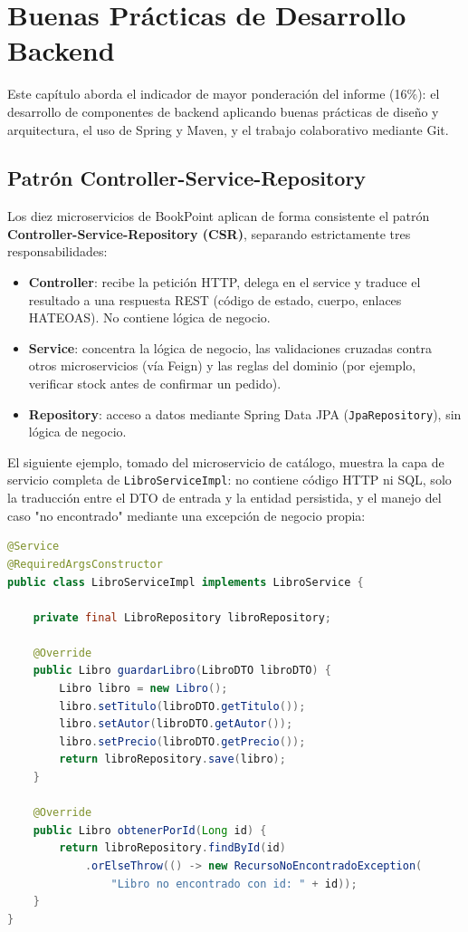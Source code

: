 \chapter{Buenas Prácticas de Desarrollo Backend}
\label{ch:buenas-practicas}

Este capítulo aborda el indicador de mayor ponderación del informe (16\%): el desarrollo
de componentes de backend aplicando buenas prácticas de diseño y arquitectura, el uso de
Spring y Maven, y el trabajo colaborativo mediante Git.

\section{Patrón Controller-Service-Repository}

Los diez microservicios de BookPoint aplican de forma consistente el patrón
\textbf{Controller-Service-Repository (CSR)}, separando estrictamente tres
responsabilidades:

\begin{itemize}
    \item \textbf{Controller}: recibe la petición HTTP, delega en el service y traduce
    el resultado a una respuesta REST (código de estado, cuerpo, enlaces HATEOAS). No
    contiene lógica de negocio.
    \item \textbf{Service}: concentra la lógica de negocio, las validaciones cruzadas
    contra otros microservicios (vía Feign) y las reglas del dominio (por ejemplo,
    verificar stock antes de confirmar un pedido).
    \item \textbf{Repository}: acceso a datos mediante Spring Data JPA
    (\texttt{JpaRepository}), sin lógica de negocio.
\end{itemize}

El siguiente ejemplo, tomado del microservicio de catálogo, muestra la capa de servicio
completa de \texttt{LibroServiceImpl}: no contiene código HTTP ni SQL, solo la
traducción entre el DTO de entrada y la entidad persistida, y el manejo del caso "no
encontrado" mediante una excepción de negocio propia:

\begin{lstlisting}[language=Java, caption={LibroServiceImpl.java -- capa de servicio de catálogo}]
@Service
@RequiredArgsConstructor
public class LibroServiceImpl implements LibroService {

    private final LibroRepository libroRepository;

    @Override
    public Libro guardarLibro(LibroDTO libroDTO) {
        Libro libro = new Libro();
        libro.setTitulo(libroDTO.getTitulo());
        libro.setAutor(libroDTO.getAutor());
        libro.setPrecio(libroDTO.getPrecio());
        return libroRepository.save(libro);
    }

    @Override
    public Libro obtenerPorId(Long id) {
        return libroRepository.findById(id)
            .orElseThrow(() -> new RecursoNoEncontradoException(
                "Libro no encontrado con id: " + id));
    }
}
\end{lstlisting}

